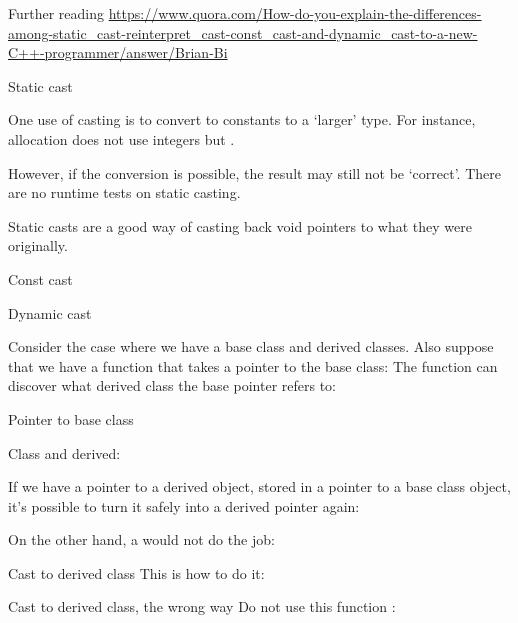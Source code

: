 Further reading \url{https://www.quora.com/How-do-you-explain-the-differences-among-static_cast-reinterpret_cast-const_cast-and-dynamic_cast-to-a-new-C++-programmer/answer/Brian-Bi}

 {Static cast}

One use of casting is to convert to constants to a `larger' type. For
instance, allocation does not use integers but .


However, if the
conversion is possible, the result may still not be `correct'.
%
%
There are no runtime tests on static casting.

Static casts are a good way of casting back void pointers to what they
were originally.

\begin{slide}{Const cast}
  \label{sl:const-cast}
\end{slide}

 {Dynamic cast}

Consider the case where we have a base class and derived classes.
%
%
Also suppose that we have a function that takes a pointer to the base
class:
%
%
The function can discover what derived class the base pointer refers
to:
%

\begin{slide}{Pointer to base class}
  \label{sl:dyn-base-ptr}

  Class and derived:
\end{slide}

If we have a pointer to a derived object, stored in a pointer to a
base class object, it's possible to turn it safely into a derived
pointer again:
%

On the other hand, a  would not do the job:
%

\begin{slide}{Cast to derived class}
  \label{sl:dyn-cast}
  This is how to do it:
\end{slide}

\begin{slide}{Cast to derived class, the wrong way}
  \label{sl:dyn-cast-wrong}
  Do not use this function :
\end{slide}

